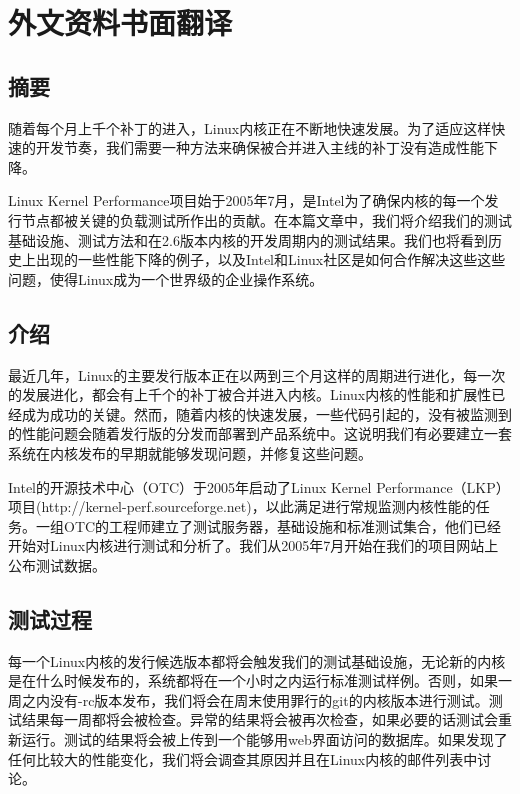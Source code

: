 

\chapter{外文资料书面翻译}
{
\begin{center}
\end{center}
}



\section*{摘要}
随着每个月上千个补丁的进入，Linux内核正在不断地快速发展。为了适应这样快速的开发节奏，我们需要一种方法来确保被合并进入主线的补丁没有造成性能下降。

Linux Kernel Performance项目始于2005年7月，是Intel为了确保内核的每一个发行节点都被关键的负载测试所作出的贡献。在本篇文章中，我们将介绍我们的测试基础设施、测试方法和在2.6版本内核的开发周期内的测试结果。我们也将看到历史上出现的一些性能下降的例子，以及Intel和Linux社区是如何合作解决这些这些问题，使得Linux成为一个世界级的企业操作系统。
\section{介绍}
最近几年，Linux的主要发行版本正在以两到三个月这样的周期进行进化，每一次的发展进化，都会有上千个的补丁被合并进入内核。Linux内核的性能和扩展性已经成为成功的关键。然而，随着内核的快速发展，一些代码引起的，没有被监测到的性能问题会随着发行版的分发而部署到产品系统中。这说明我们有必要建立一套系统在内核发布的早期就能够发现问题，并修复这些问题。

Intel的开源技术中心（OTC）于2005年启动了Linux Kernel Performance（LKP）项目(http://kernel-perf.sourceforge.net)，以此满足进行常规监测内核性能的任务。一组OTC的工程师建立了测试服务器，基础设施和标准测试集合，他们已经开始对Linux内核进行测试和分析了。我们从2005年7月开始在我们的项目网站上公布测试数据。
\section{测试过程}
每一个Linux内核的发行候选版本都将会触发我们的测试基础设施，无论新的内核是在什么时候发布的，系统都将在一个小时之内运行标准测试样例。否则，如果一周之内没有-rc版本发布，我们将会在周末使用罪行的git的内核版本进行测试。测试结果每一周都将会被检查。异常的结果将会被再次检查，如果必要的话测试会重新运行。测试的结果将会被上传到一个能够用web界面访问的数据库。如果发现了任何比较大的性能变化，我们将会调查其原因并且在Linux内核的邮件列表中讨论。

